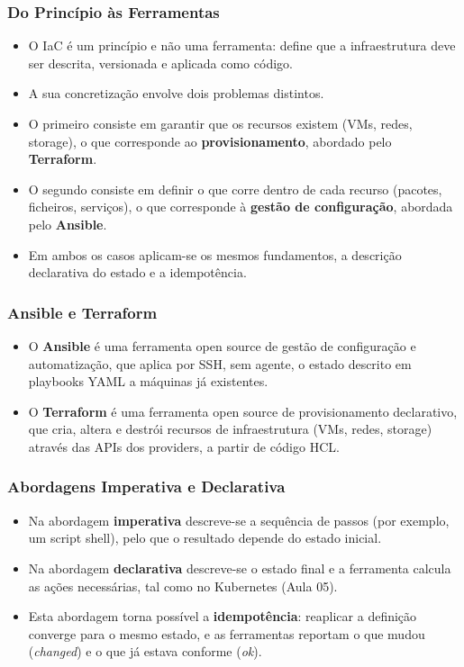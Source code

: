 \documentclass[aspectratio=169]{beamer}
\begin{document}
\begin{frame}
\frametitle{Do Princípio às Ferramentas}
\begin{itemize}
    \setlength\itemsep{0.4cm}
    \item O IaC é um princípio e não uma ferramenta: define que a infraestrutura deve ser descrita, versionada e aplicada como código.
    \item A sua concretização envolve dois problemas distintos.
    \item O primeiro consiste em garantir que os recursos existem (VMs, redes, storage), o que corresponde ao \textbf{provisionamento}, abordado pelo \textbf{Terraform}.
    \item O segundo consiste em definir o que corre dentro de cada recurso (pacotes, ficheiros, serviços), o que corresponde à \textbf{gestão de configuração}, abordada pelo \textbf{Ansible}.
    \item Em ambos os casos aplicam-se os mesmos fundamentos, a descrição declarativa do estado e a idempotência.
\end{itemize}
\end{frame}

\begin{frame}
\frametitle{Ansible e Terraform}
\begin{itemize}
    \setlength\itemsep{0.6cm}
    \item O \textbf{Ansible} é uma ferramenta open source de gestão de configuração e automatização, que aplica por SSH, sem agente, o estado descrito em playbooks YAML a máquinas já existentes.
    \item O \textbf{Terraform} é uma ferramenta open source de provisionamento declarativo, que cria, altera e destrói recursos de infraestrutura (VMs, redes, storage) através das APIs dos providers, a partir de código HCL.
\end{itemize}
\end{frame}

\begin{frame}
\frametitle{Abordagens Imperativa e Declarativa}
\begin{itemize}
    \setlength\itemsep{0.4cm}
    \item Na abordagem \textbf{imperativa} descreve-se a sequência de passos (por exemplo, um script shell), pelo que o resultado depende do estado inicial.
    \item Na abordagem \textbf{declarativa} descreve-se o estado final e a ferramenta calcula as ações necessárias, tal como no Kubernetes (Aula 05).
    \item Esta abordagem torna possível a \textbf{idempotência}: reaplicar a definição converge para o mesmo estado, e as ferramentas reportam o que mudou (\textit{changed}) e o que já estava conforme (\textit{ok}).
\end{itemize}
\end{frame}
\end{document}
